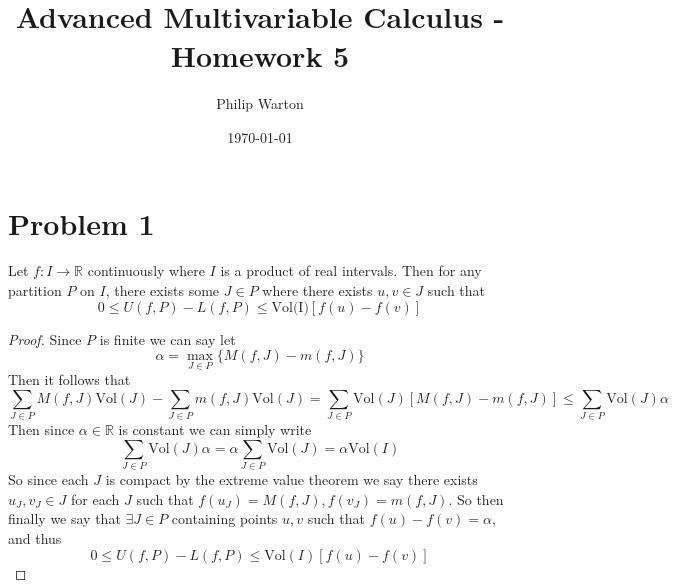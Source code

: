 \documentclass{article}
\theoremstyle{definition}
\begin{document}
\title{Advanced Multivariable Calculus - Homework 5}
\author{Philip Warton}
\date{\today}
\maketitle
\section*{Problem 1}
\begin{mdframed}[]
    Let $f:I \rightarrow \mathbb{R}$ continuously where $I$ is a product of real intervals.
    Then for any partition $P$ on $I$, there exists some $J \in P$ where there exists $u,v\in J$
    such that 
    \[
        0 \leqslant U(f,P) - L(f,P) \leqslant \text{Vol(I)}[f(u)-f(v)]
    \]
\end{mdframed}
\begin{proof}
Since $P$ is finite we can say let 
\[
    \alpha = \max_{J \in P}\{M(f,J) - m(f,J)\}
\]
Then it follows that 
\[
    \sum_{J \in P}M(f,J)\text{Vol}(J) - \sum_{J \in P}m(f,J)\text{Vol}(J) = \sum_{J \in P}\text{Vol}(J)[M(f,J) - m(f,J)] \leqslant \sum_{J \in P}\text{Vol}(J)\alpha
\]
Then since $\alpha \in \mathbb{R}$ is constant we can simply write
\[
    \sum_{J \in P}\text{Vol}(J)\alpha = \alpha\sum_{J \in P}\text{Vol}(J) = \alpha \text{Vol}(I)
\]
So since each $J$ is compact by the extreme value theorem we say there exists $u_J,v_J \in J$ for each $J$
such that $f(u_J) = M(f,J), f(v_J) = m(f,J)$. So then finally we say that $\exists J \in P$ containing points 
$u,v$ such that $f(u) - f(v) = \alpha$, and thus
\[
    0 \leqslant U(f,P) - L(f,P) \leqslant \text{Vol}(I)[f(u) - f(v)]
\]
\end{proof}
\end{document}
